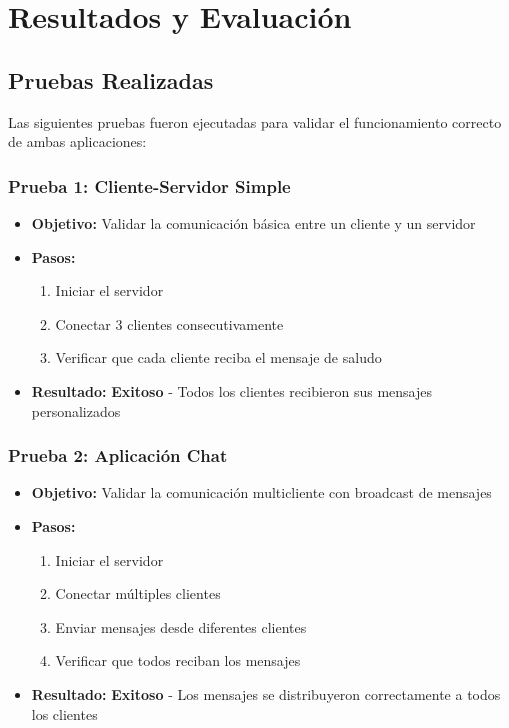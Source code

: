 \documentclass{article}
\begin{document}
\section{Resultados y Evaluación}

\subsection{Pruebas Realizadas}

Las siguientes pruebas fueron ejecutadas para validar el funcionamiento correcto de ambas aplicaciones:

\subsubsection{Prueba 1: Cliente-Servidor Simple}
\begin{itemize}
    \item \textbf{Objetivo:} Validar la comunicación básica entre un cliente y un servidor
    \item \textbf{Pasos:}
    \begin{enumerate}
        \item Iniciar el servidor
        \item Conectar 3 clientes consecutivamente
        \item Verificar que cada cliente reciba el mensaje de saludo
    \end{enumerate}
    \item \textbf{Resultado:} \checkmark \textbf{Exitoso} - Todos los clientes recibieron sus mensajes personalizados
\end{itemize}

\subsubsection{Prueba 2: Aplicación Chat}
\begin{itemize}
    \item \textbf{Objetivo:} Validar la comunicación multicliente con broadcast de mensajes
    \item \textbf{Pasos:}
    \begin{enumerate}
        \item Iniciar el servidor
        \item Conectar múltiples clientes
        \item Enviar mensajes desde diferentes clientes
        \item Verificar que todos reciban los mensajes
    \end{enumerate}
    \item \textbf{Resultado:} \checkmark \textbf{Exitoso} - Los mensajes se distribuyeron correctamente a todos los clientes
\end{itemize}
\end{document}
